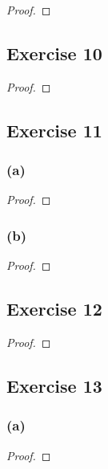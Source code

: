 \documentclass[14pt]{extarticle}
\begin{document}
\begin{proof}

\end{proof}

\subsection{Exercise 10}

\begin{proof}

\end{proof}

\subsection{Exercise 11}

\subsubsection{(a)}

\begin{proof}

\end{proof}

\subsubsection{(b)}

\begin{proof}

\end{proof}

\subsection{Exercise 12}

\begin{proof}

\end{proof}

\subsection{Exercise 13}

\subsubsection{(a)}

\begin{proof}

\end{proof}
\end{document}
